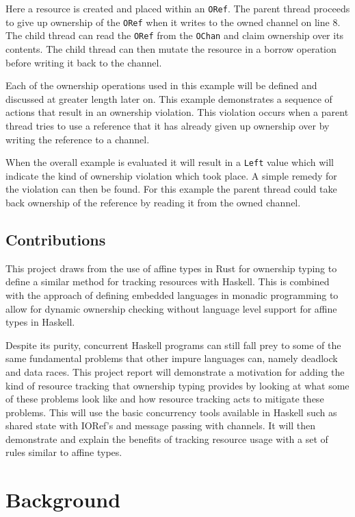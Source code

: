 \documentclass[onehalf,11pt]{beavtex}
\begin{document}
Here a resource is created and placed within an \texttt{ORef}.
The parent thread proceeds to give up ownership of the \texttt{ORef} when it
writes to the owned channel on line 8.
The child thread can read the \texttt{ORef} from the \texttt{OChan} and claim
ownership over its contents.
The child thread can then mutate the resource in a borrow operation before
writing it back to the channel. 

Each of the ownership operations used in this example will be defined
and discussed at greater length later on.
This example demonstrates a sequence of actions that result in an ownership
violation.
This violation occurs when a parent thread tries to use a reference that it
has already given up ownership over by writing the reference to a channel.

When the overall example is evaluated it will result in a \texttt{Left} value
which will indicate the kind of ownership violation which took place.
A simple remedy for the violation can then be found.
For this example the parent thread could take back ownership of the reference by
reading it from the owned channel.

\section{Contributions}

This project draws from the use of affine types in Rust for
ownership typing to define a similar method for tracking resources with Haskell.
This is combined with the approach of defining embedded languages in monadic
programming to allow for dynamic ownership checking without language level
support for affine types in Haskell.

Despite its purity,
concurrent Haskell programs can still fall prey to some of the same fundamental
problems that other impure languages can, namely deadlock and data races.
This project report will demonstrate a motivation for adding the kind of
resource tracking that ownership typing provides by
looking at what some of these problems look like and how resource tracking acts
to mitigate these problems. %
This will use the basic concurrency tools available in Haskell
such as shared state with IORef's and message passing with channels.
It will then demonstrate and explain the benefits of tracking resource usage
with a set of rules similar to affine types.

\chapter{Background}
\end{document}
